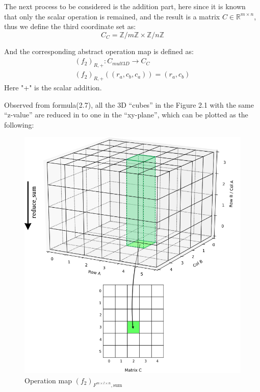 \documentclass{amsart}
\theoremstyle{definition}
\theoremstyle{remark}
\numberwithin{equation}{section}
\begin{document}
The next process to be considered is the addition part, here since it is known that only the scalar operation is remained, and the result is a matrix $C\in \mathbb{R}^{m\times n}$, thus we define the third coordinate set as:
\begin{equation}
C_C=\mathbb{Z}/{m\mathbb{Z}}\times \mathbb{Z}/{n\mathbb{Z}}
\end{equation}\par
And the corresponding abstract operation map is defined as:
\begin{equation}
\begin{array}{l}  
             (f_2)_{R,+}:C_{mult3D}\to C_C\\ 
             (f_2)_{R,+}((r_a,c_b,c_a))=(r_a,c_b)
\end{array}
\end{equation}
Here "+" is the scalar addition.

	Observed from formula(2.7), all the 3D “cubes” in the Figure 2.1 with the same “z-value” are reduced in to one in the “xy-plane”, which can be plotted as the following:\par

\begin{figure}[tb]
	\includegraphics[scale=0.3]{Figures/Matrix3d_Reduce.png}
	\caption{Operation map $(f_2)_{F^{m\times l\times n},\text{sum}}$}
\end{figure}
\end{document}
